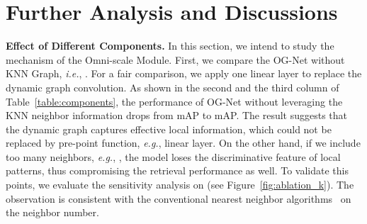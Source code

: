 \documentclass[journal]{IEEEtran}
\def\eg{\emph{e.g.}}
\def\ie{\emph{i.e.}}
\begin{document}
\setlength{\tabcolsep}{5pt}
\begin{table}[t]{
\caption{Classification results on ModelNet~\cite{wu20153d}. We do not focus on the point cloud classification problem, but show the feasibility of the proposed OG-Net. : We provide results based on our re-implementation, which is slightly higher than the reported result in \cite{qi2017pointnet++}. } \label{table:model}
{
}}
\end{table}

\section{Further Analysis and Discussions}


\noindent\textbf{Effect of Different Components.} In this section, we intend to study the mechanism of the Omni-scale Module. First, we compare the OG-Net without KNN Graph, \ie, . For a fair comparison, we apply one linear layer to replace the dynamic graph convolution. 
As shown in the second and the third column of Table~\ref{table:components}, the performance of OG-Net without leveraging the KNN neighbor information drops from  mAP to  mAP. The result suggests that the dynamic graph captures effective local information, which could not be replaced by pre-point function, \eg, linear layer. On the other hand, if we include too many neighbors, \eg, , the model loses the discriminative feature of local patterns, thus compromising the retrieval performance as well. To validate this points, we evaluate the sensitivity analysis on  (see Figure~\ref{fig:ablation_k}). The observation is consistent with the conventional  nearest neighbor algorithms~\cite{peterson2009k} on the neighbor number.
\end{document}

